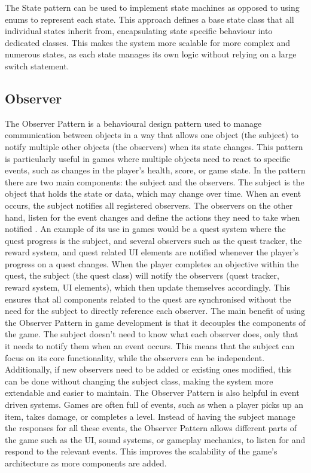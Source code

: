 \documentclass[10pt]{final_report}
\begin{document}
\newline
The State pattern can be used to implement state machines as opposed to using enums to represent each state. This approach defines a base state class that all individual states inherit from, encapsulating state specific behaviour into dedicated classes. This makes the system more scalable for more complex and numerous states, as each state manages its own logic without relying on a large switch statement.  

\subsection{Observer}\label{observer}
The Observer Pattern is a behavioural design pattern used to manage communication between objects in a way that allows one object (the subject) to notify multiple other objects (the observers) when its state changes. This pattern is particularly useful in games where multiple objects need to react to specific events, such as changes in the player’s health, score, or game state. In the pattern there are two main components: the subject and the observers. The subject is the object that holds the state or data, which may change over time. When an event occurs, the subject notifies all registered observers. The observers on the other hand, listen for the event changes and define the actions they need to take when notified \cite{nystrom2011game}.
\newline
An example of its use in games would be a quest system where the quest progress is the subject, and several observers such as the quest tracker, the reward system, and quest related UI elements are notified whenever the player's progress on a quest changes. When the player completes an objective within the quest, the subject (the quest class) will notify the observers (quest tracker, reward system, UI elements), which then update themselves accordingly. This ensures that all components related to the quest are synchronised without the need for the subject to directly reference each observer.
\newline
The main benefit of using the Observer Pattern in game development is that it decouples the components of the game. The subject doesn’t need to know what each observer does, only that it needs to notify them when an event occurs. This means that the subject can focus on its core functionality, while the observers can be independent. Additionally, if new observers need to be added or existing ones modified, this can be done without changing the subject class, making the system more extendable and easier to maintain.
\newline
The Observer Pattern is also helpful in event driven systems. Games are often full of events, such as when a player picks up an item, takes damage, or completes a level. Instead of having the subject manage the responses for all these events, the Observer Pattern allows different parts of the game such as the UI, sound systems, or gameplay mechanics, to listen for and respond to the relevant events. This improves the scalability of the game’s architecture as more components are added.
\end{document}
